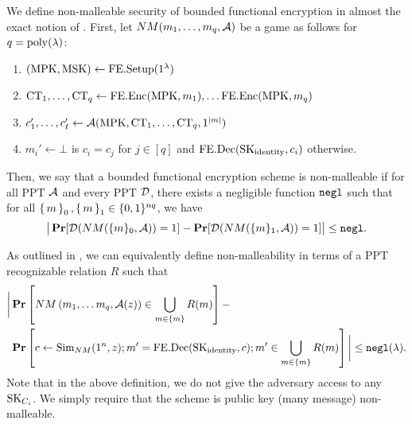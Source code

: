 We define non-malleable security of bounded functional encryption in almost the exact
notion of \cite{PassNM}. First,
let $NM(m_1, \dots, m_q, \mathcal{A})$ be a game as follows for $q = \operatorname{poly}(\lambda)$:
\begin{enumerate}
	\item $(\text{MPK}, \text{MSK}) \gets \text{FE.Setup}(1^\lambda)$
	\item $\text{CT}_1, \dots, \text{CT}_q \gets \text{FE.Enc}(\text{MPK}, m_1), \dots \text{FE.Enc}(\text{MPK}, m_q)$
	\item $c_1', \dots, c_\ell' \gets \mathcal{A}(\text{MPK}, \text{CT}_1, \dots, \text{CT}_q, 1^{|m|})$
	\item $m_i' \gets \bot$ is $c_i = c_j$ for $j \in [q]$ and $\text{FE.Dec}(\text{SK}_{\text{identity}}, c_i)$ otherwise.
\end{enumerate}
Then, we say that a bounded functional encryption scheme is non-malleable if for all PPT $\mathcal{A}$
and every PPT $\mathcal{D}$, there exists a negligible function $\texttt{negl}$ such that
for all $\set{m}_0, \set{m}_1 \in \{0, 1\}^{nq}$, we have
\begin{equation}
	\big|\operatorname*{\mathbf{Pr}}[\mathcal{D}(NM(\{m\}_0, \mathcal{A})) = 1] - \operatorname*{\mathbf{Pr}}[\mathcal{D}(NM(\{m\}_1 , \mathcal{A})) = 1] \big|\leq \texttt{negl}.
\end{equation}

As outlined in \cite{PassNM}, we can equivalently define non-malleability in terms of a PPT recognizable relation $R$
such that
\begin{align}
	\label{eq:NMRel}
	\bigg|\operatorname*{\mathbf{Pr}}&\left[NM\left(m_1, \dots m_q, \mathcal{A}(z)\right) \in \bigcup_{m \in \{m\}} R(m)\right]- \\
				\operatorname*{\mathbf{Pr}}&\left[c \gets \text{Sim}_{NM}(1^n, z); m' = \text{FE.Dec}(\text{SK}_{\text{identity}}, c); m' \in \bigcup_{m \in \{m\}} R(m)\right]\bigg| \leq \texttt{negl}(\lambda).
\end{align}
Note that in the above definition, we do not give the adversary access to any $\text{SK}_{C_i}$.
We simply require that the scheme is public key (many message) non-malleable.

